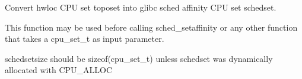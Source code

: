 Convert hwloc C\+PU set {\ttfamily toposet} into glibc sched affinity C\+PU set {\ttfamily schedset}. 

This function may be used before calling sched\+\_\+setaffinity or any other function that takes a cpu\+\_\+set\+\_\+t as input parameter.

{\ttfamily schedsetsize} should be sizeof(cpu\+\_\+set\+\_\+t) unless {\ttfamily schedset} was dynamically allocated with C\+P\+U\+\_\+\+A\+L\+L\+OC 